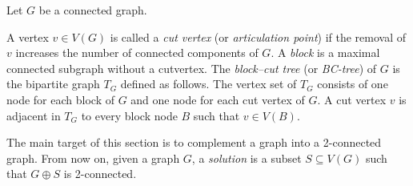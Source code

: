 \documentclass[11pt]{article}
\theoremstyle{definition}
\begin{document}
Let \( G \) be a connected graph.

A vertex \( v \in V(G) \) is called a \emph{cut vertex} (or \emph{articulation point}) if the removal of \( v \) increases the number of connected components of \( G \).
A
\emph{block} is a maximal connected subgraph without a cutvertex.
The \emph{block--cut tree} (or \emph{BC-tree}) of \( G \) is the bipartite graph \( T_G \) defined as follows.  
The vertex set of \( T_G \) consists of one node for each block of \( G \) and one node for each cut vertex of \( G \).  
A cut vertex \( v \) is adjacent in \( T_G \) to every block node \( B \) such that \( v \in V(B) \).

The main target of this section is to complement a graph into a 2-connected graph. From now on, given a graph $G$, a \emph{solution} is a subset $S \subseteq V(G)$ such that $G \oplus S$ is 2-connected.
\end{document}
